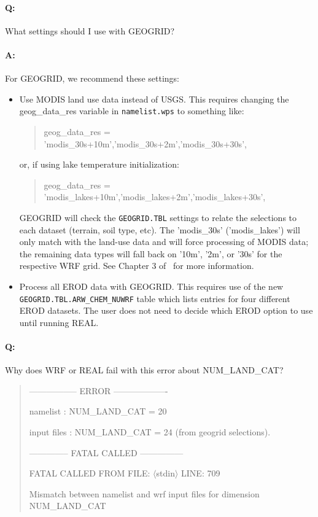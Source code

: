 \paragraph{Q:} What settings should I use with GEOGRID?

\paragraph{A:} For GEOGRID, we recommend these settings:

\begin{itemize}
\item Use MODIS land use data instead of USGS. This requires changing the
geog\_data\_res variable in \texttt{namelist.wps} to something like:

\begin{quote}
 geog\_data\_res = 'modis\_30s+10m','modis\_30s+2m','modis\_30s+30s',
\end{quote}

or, if using lake temperature initialization:

\begin{quote}
 geog\_data\_res = 'modis\_lakes+10m','modis\_lakes+2m','modis\_lakes+30s',
\end{quote}

GEOGRID will check the \texttt{GEOGRID.TBL} settings to relate the selections
to each dataset (terrain, soil type, etc). The 'modis\_30s' ('modis\_lakes')
will only match with the land-use data and will force processing of MODIS 
data; the remaining data types will fall back on '10m', '2m', or '30s' for 
the respective WRF grid.  See Chapter 3 of~\cite{ref:ArwUserGuide} for more 
information.

\item Process all EROD data with GEOGRID. This requires use of the new
\texttt{GEOGRID.TBL.ARW\_CHEM\_NUWRF} table which lists entries for four 
different EROD datasets. The user does not need to decide which EROD option
to use until running REAL.

\end{itemize}


\paragraph{Q:} Why does WRF or REAL fail with this error about NUM\_LAND\_CAT?
\begin{quote}
----------------- ERROR -------------------

 namelist    : NUM\_LAND\_CAT =         20

 input files : NUM\_LAND\_CAT =         24 (from geogrid selections).

 -------------- FATAL CALLED ---------------

 FATAL CALLED FROM FILE:  $\langle$stdin$\rangle$  LINE:     709

 Mismatch between namelist and wrf input files for dimension NUM\_LAND\_CAT
\end{quote}


